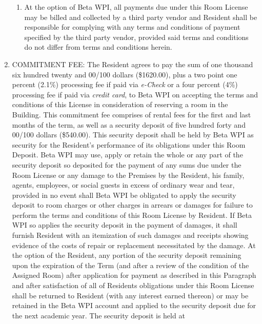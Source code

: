 \documentclass[legalpaper, 12pt]{article}
\begin{document}
\begin{enumerate}
\begin{enumerate}[label=\Alph*.]
\item At the option of Beta WPI, all payments due under this Room License may be billed and collected by a third party vendor and Resident shall be responsible for complying with any terms and conditions of payment specified by the third party vendor, provided said terms and conditions do not differ from terms and conditions herein.

\end{enumerate}

\item\label{itm:commitmentfee}

COMMITMENT FEE\@: The Resident agrees to pay the sum of one thousand six hundred twenty and 00/100 dollars (\$1620.00), plus a two point one percent (2.1\%) processing fee if paid via \textit{e-Check} or a four percent (4\%) processing fee if paid via \textit{credit card}, to Beta WPI on accepting the terms and conditions of this License in consideration of reserving a room in the Building.
This commitment fee comprises of rental fees for the first and last months of the term, as well as a security deposit of five hundred forty and 00/100 dollars (\$540.00).
This security deposit shall be held by Beta WPI as security for the Resident’s performance of its obligations under this Room Deposit.
Beta WPI may use, apply or retain the whole or any part of the security deposit so deposited for the payment of any sums due under the Room License or any damage to the Premises by the Resident, his family, agents, employees, or social guests in excess of ordinary wear and tear, provided in no event shall Beta WPI be obligated to apply the security deposit to room charges or other charges in arrears or damages for failure to perform the terms and conditions of this Room License by Resident.
If Beta WPI so applies the security deposit in the payment of damages, it shall furnish Resident with an itemization of such damages and receipts showing evidence of the costs of repair or replacement necessitated by the damage.
At the option of the Resident, any portion of the security deposit remaining upon the expiration of the Term (and after a review of the condition of the Assigned Room) after application for payment as described in this Paragraph and after satisfaction of all of Residents obligations under this Room License shall be returned to Resident (with any interest earned thereon) or may be retained in the Beta WPI account and applied to the security deposit due for the next academic year.
The security deposit is held at\\ 


\end{enumerate}
\end{document}

